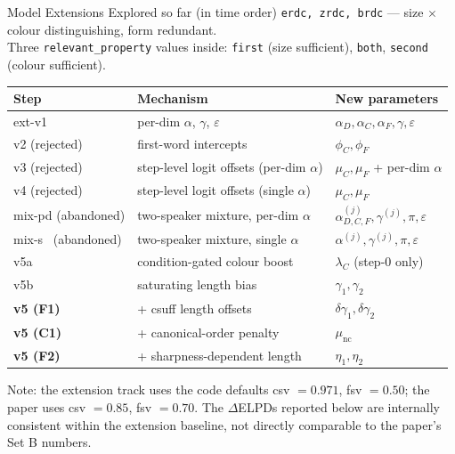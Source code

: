 \documentclass[10pt,aspectratio=169]{beamer}
\newcommand{\main}[1]{\textcolor{CSP-main-dark}{\textbf{#1}}}
\newcommand{\emp}[1]{\textcolor{CSP-emphasis}{\textbf{#1}}}
\newcommand{\acct}[1]{\textcolor{CSP-accent-1-dark}{#1}}      %
\newcommand{\accy}[1]{\textcolor{CSP-accent-2-dark}{#1}}      %
\newcommand{\accg}[1]{\textcolor{CSP-accent-3-dark}{#1}}      %
\newcommand{\muted}[1]{\textcolor{CSP-text-light}{#1}}
\begin{document}
\begin{frame}{Model Extensions Explored so far (in time order)}
\footnotesize
\texttt{erdc, zrdc, brdc} --- size $\times$ colour distinguishing, form redundant.\\
Three \texttt{relevant\_property} values inside: \acct{\texttt{first}} (size sufficient), \accg{\texttt{both}}, \accy{\texttt{second}} (colour sufficient).

\vspace{0.6em}
\begin{center}
\renewcommand{\arraystretch}{1.25}
\begin{tabular}{lll}
\toprule
Step & Mechanism & New parameters\\
\midrule
ext-v1 & per-dim $\alpha$, $\gamma$, $\varepsilon$  & $\alpha_D,\alpha_C,\alpha_F,\gamma,\varepsilon$\\
\muted{v2 (rejected)} & \muted{first-word intercepts}                       & \muted{$\phi_C,\phi_F$}\\
\muted{v3 (rejected)} & \muted{step-level logit offsets (per-dim $\alpha$)} & \muted{$\mu_C,\mu_F$ + per-dim $\alpha$}\\
\muted{v4 (rejected)} & \muted{step-level logit offsets (single $\alpha$)}  & \muted{$\mu_C,\mu_F$}\\
\muted{mix-pd (abandoned)} & \muted{two-speaker mixture, per-dim $\alpha$}       & \muted{$\alpha^{(j)}_{D,C,F},\gamma^{(j)},\pi,\varepsilon$}\\
\muted{mix-s \ (abandoned)} & \muted{two-speaker mixture, single $\alpha$}        & \muted{$\alpha^{(j)},\gamma^{(j)},\pi,\varepsilon$}\\
\acct{v5a}     & condition-gated colour boost      & $\lambda_C$ (step-0 only)\\
\acct{v5b}     & saturating length bias            & $\gamma_1, \gamma_2$\\
\main{v5 (F1)} & + csuff length offsets            & $\delta\gamma_1, \delta\gamma_2$\\
\main{v5 (C1)} & + canonical-order penalty         & $\mu_\mathrm{nc}$\\
\emp{v5 (F2)}  & + sharpness-dependent length      & $\eta_1, \eta_2$\\
\bottomrule
\end{tabular}
\end{center}

\vspace{0.5em}
\muted{Note: the extension track uses the code defaults csv $= 0.971$, fsv $= 0.50$; the paper uses csv $= 0.85$, fsv $= 0.70$. The $\Delta$ELPDs reported below are internally consistent within the extension baseline, not directly comparable to the paper's Set B numbers.}
\end{frame}
\end{document}
